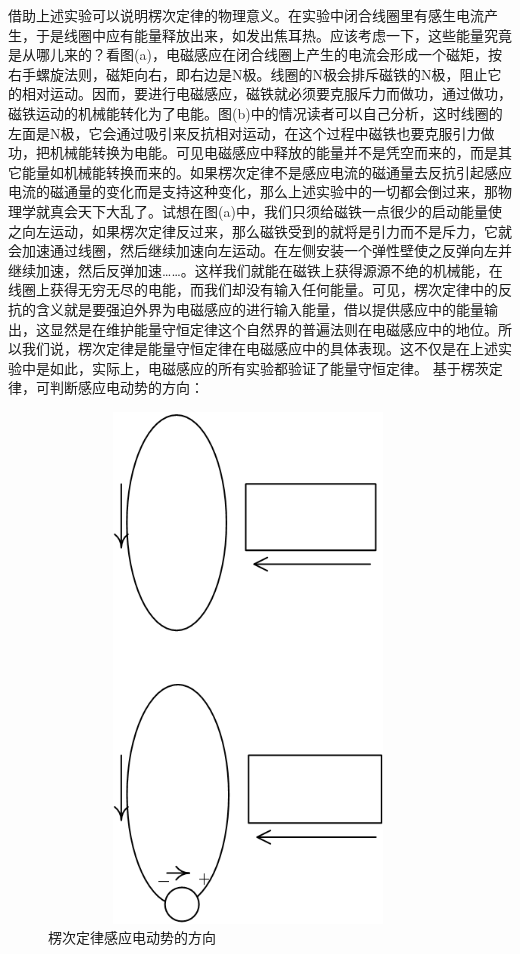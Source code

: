 \documentclass{book}
\begin{document}
借助上述实验可以说明楞次定律的物理意义。在实验中闭合线圈里有感生电流产生，于是线圈中应有能量释放出来，如发出焦耳热。应该考虑一下，这些能量究竟是从哪儿来的？看图(a)，电磁感应在闭合线圈上产生的电流会形成一个磁矩，按右手螺旋法则，磁矩向右，即右边是N极。线圈的N极会排斥磁铁的N极，阻止它的相对运动。因而，要进行电磁感应，磁铁就必须要克服斥力而做功，通过做功，磁铁运动的机械能转化为了电能。图(b)中的情况读者可以自己分析，这时线圈的左面是N极，它会通过吸引来反抗相对运动，在这个过程中磁铁也要克服引力做功，把机械能转换为电能。可见电磁感应中释放的能量并不是凭空而来的，而是其它能量如机械能转换而来的。如果楞次定律不是感应电流的磁通量去反抗引起感应电流的磁通量的变化而是支持这种变化，那么上述实验中的一切都会倒过来，那物理学就真会天下大乱了。试想在图(a)中，我们只须给磁铁一点很少的启动能量使之向左运动，如果楞次定律反过来，那么磁铁受到的就将是引力而不是斥力，它就会加速通过线圈，然后继续加速向左运动。在左侧安装一个弹性壁使之反弹向左并继续加速，然后反弹加速……。这样我们就能在磁铁上获得源源不绝的机械能，在线圈上获得无穷无尽的电能，而我们却没有输入任何能量。可见，楞次定律中的反抗的含义就是要强迫外界为电磁感应的进行输入能量，借以提供感应中的能量输出，这显然是在维护能量守恒定律这个自然界的普遍法则在电磁感应中的地位。所以我们说，楞次定律是能量守恒定律在电磁感应中的具体表现。这不仅是在上述实验中是如此，实际上，电磁感应的所有实验都验证了能量守恒定律。
基于楞茨定律，可判断感应电动势的方向：
\begin{figure}[H]
	\centering
	\includegraphics[width=25pc,height=32pc]{lenz}
	\caption{楞次定律感应电动势的方向}
	\label{fig:lenz}
\end{figure}
\end{document}
